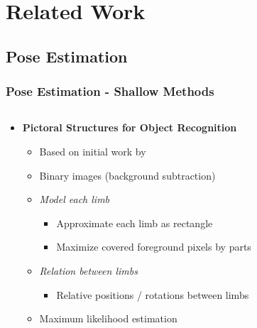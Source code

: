 \documentclass[9pt]{beamer}
\newenvironment{myframe}[1][]{%
\begin{frame}%
\frametitle{#1}
\setcounter{footnote}{0}


}{%
\end{frame}%
}
\begin{document}
\section{Related Work}
\subsection{Pose Estimation}

\begin{myframe}[Pose Estimation - Shallow Methods]
    \note[item]{}
    \begin{columns}[T]
        \begin{column}{.48\textwidth}
            \begin{itemize}
                \item \textbf{Pictoral Structures for Object Recognition \footnotemark}
              \begin{itemize}
                  \item Based on initial work by \footnotemark
                  \item Binary images (background subtraction)
                  \item \textit{Model each limb}
                  \begin{itemize}
                      \item Approximate each limb as rectangle
                      \item Maximize covered foreground pixels by parts
                  \end{itemize}
                  \item \textit{Relation between limbs}
                  \begin{itemize}
                      \item Relative positions / rotations between limbs 
                  \end{itemize}
                  \item Maximum likelihood estimation

\end{itemize}
\end{itemize}
\end{column}
\end{columns}
\end{myframe}
\end{document}

